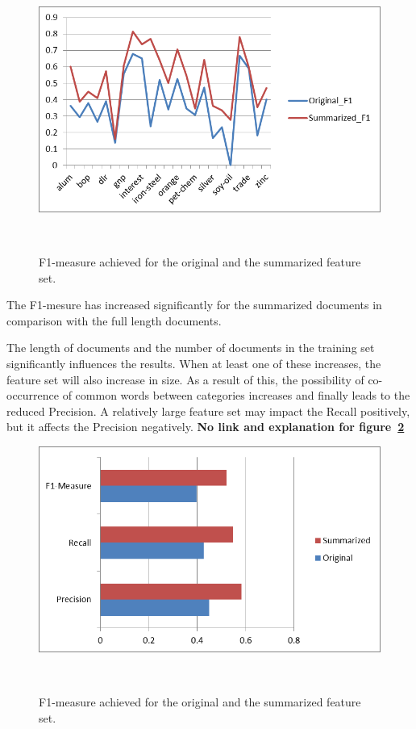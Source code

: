 \documentclass{sigchi}
\begin{document}
\begin{figure}
\centering
  \includegraphics[width=0.9\columnwidth]{figures/DocumentClassificationAzadehDorna-006}
  \caption{F1-measure achieved for the original and the summarized feature set.}~\label{figureF1}
\end{figure}
The F1-mesure has increased significantly for the summarized documents in comparison with the full length documents.

The length of documents and the number of documents in the training set significantly influences the results. 
When at least one of these increases, the feature set will also increase in size. 
As a result of this, the possibility of co-occurrence of common words between categories increases and finally leads to the reduced Precision. 
A relatively large feature set may impact the Recall positively, but it affects the Precision negatively.
\textbf{No link and explanation for figure~\ref{figureSummary}}
\begin{figure}
\centering
  \includegraphics[width=0.9\columnwidth]{figures/DocumentClassificationAzadehDorna-008}
  \caption{F1-measure achieved for the original and the summarized feature set.}~\label{figureSummary}
\end{figure}
\end{document}
